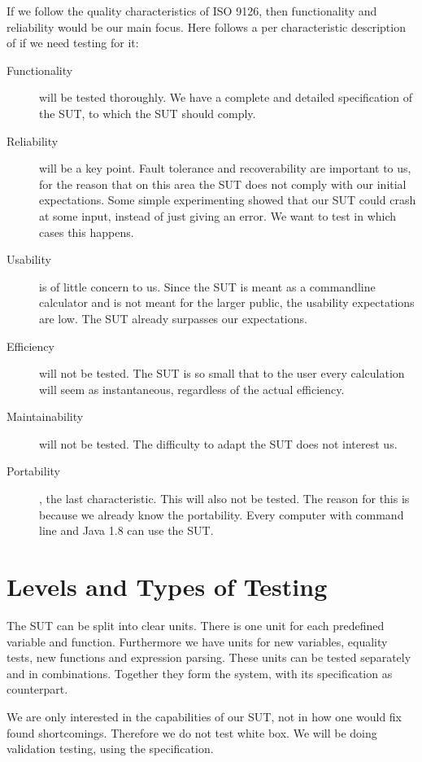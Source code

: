 \documentclass[11pt,a4paper]{article}
\begin{document}
If we follow the quality characteristics of ISO 9126, then functionality and reliability would be our main focus. Here follows a per characteristic description of if we need testing for it:
\begin{description}
	\item[Functionality] will be tested thoroughly. We have a complete and detailed specification of the SUT, to which the SUT should comply.
	\item[Reliability] will be a key point. Fault tolerance and recoverability are important to us, for the reason that on this area the SUT does not comply with our initial expectations. Some simple experimenting showed that our SUT could crash at some input, instead of just giving an error. We want to test in which cases this happens.
	\item[Usability] is of little concern to us. Since the SUT is meant as a commandline calculator and is not meant for the larger public, the usability expectations are low. The SUT already surpasses our expectations.
	\item[Efficiency] will not be tested. The SUT is so small that to the user every calculation will seem as instantaneous, regardless of the actual efficiency. %
	\item[Maintainability] will not be tested. The difficulty to adapt the SUT does not interest us. %
	\item[Portability], the last characteristic. This will also not be tested. The reason for this is because we already know the portability. Every computer with command line and Java 1.8 can use the SUT.
\end{description}

\section{Levels and Types of Testing} \label{levels}

The SUT can be split into clear units. There is one unit for each predefined variable and function. Furthermore we have units for new variables, equality tests, new functions and expression parsing. These units can be tested separately and in combinations. Together they form the system, with its specification as counterpart.

\fi




We are only interested in the capabilities of our SUT, not in how one
would fix found shortcomings. Therefore we do not test white box. We %
will be doing validation testing, using the specification.
\end{document}
